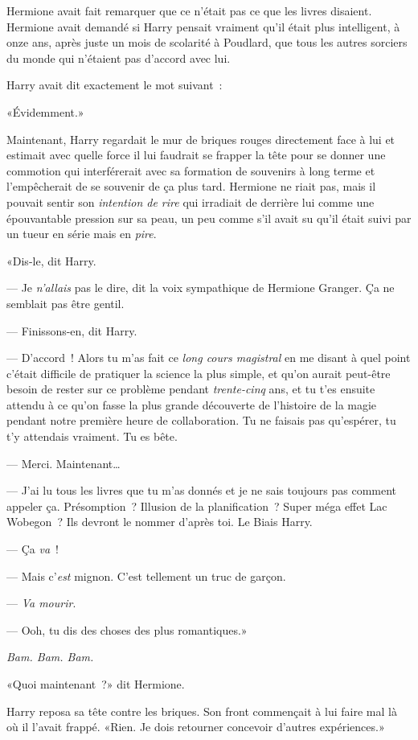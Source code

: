 Hermione avait fait remarquer que ce n'était pas ce que les livres disaient. Hermione avait demandé si Harry pensait vraiment qu'il était plus intelligent, à onze ans, après juste un mois de scolarité à Poudlard, que tous les autres sorciers du monde qui n'étaient pas d'accord avec lui.

Harry avait dit exactement le mot suivant~:

«Évidemment.»

Maintenant, Harry regardait le mur de briques rouges directement face à lui et estimait avec quelle force il lui faudrait se frapper la tête pour se donner une commotion qui interférerait avec sa formation de souvenirs à long terme et l'empêcherait de se souvenir de ça plus tard. Hermione ne riait pas, mais il pouvait sentir son \emph{intention de rire} qui irradiait de derrière lui comme une épouvantable pression sur sa peau, un peu comme s'il avait su qu'il était suivi par un tueur en série mais en \emph{pire}.

«Dis-le, dit Harry.

--- Je \emph{n'allais} pas le dire, dit la voix sympathique de Hermione Granger. Ça ne semblait pas être gentil.

--- Finissons-en, dit Harry.

--- D'accord~! Alors tu m'as fait ce \emph{long cours magistral} en me disant à quel point c'était difficile de pratiquer la science la plus simple, et qu'on aurait peut-être besoin de rester sur ce problème pendant \emph{trente-cinq} ans, et tu t'es ensuite attendu à ce qu'on fasse la plus grande découverte de l'histoire de la magie pendant notre première heure de collaboration. Tu ne faisais pas qu'espérer, tu t'y attendais vraiment. Tu es bête.

--- Merci. Maintenant…

--- J'ai lu tous les livres que tu m'as donnés et je ne sais toujours pas comment appeler ça. Présomption~? Illusion de la planification~? Super méga effet Lac Wobegon~? Ils devront le nommer d'après toi. Le Biais Harry.

--- Ça \emph{va}~!

--- Mais c'\emph{est} mignon. C'est tellement un truc de garçon.

--- \emph{Va mourir}.

--- Ooh, tu dis des choses des plus romantiques.»

\emph{Bam. Bam. Bam.}

«Quoi maintenant~?» dit Hermione.

Harry reposa sa tête contre les briques. Son front commençait à lui faire mal là où il l'avait frappé. «Rien. Je dois retourner concevoir d'autres expériences.»

